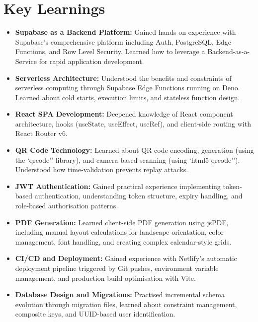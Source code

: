 \documentclass{SOICTthesis}
\begin{document}
\section{Key Learnings}
\label{sec:learnings}

\begin{itemize}
    \item \textbf{Supabase as a Backend Platform:} Gained hands-on experience with Supabase's comprehensive platform including Auth, PostgreSQL, Edge Functions, and Row Level Security. Learned how to leverage a Backend-as-a-Service for rapid application development.

    \item \textbf{Serverless Architecture:} Understood the benefits and constraints of serverless computing through Supabase Edge Functions running on Deno. Learned about cold starts, execution limits, and stateless function design.

    \item \textbf{React SPA Development:} Deepened knowledge of React component architecture, hooks (useState, useEffect, useRef), and client-side routing with React Router v6.

    \item \textbf{QR Code Technology:} Learned about QR code encoding, generation (using the `qrcode'' library), and camera-based scanning (using `html5-qrcode''). Understood how time-validation prevents replay attacks.

    \item \textbf{JWT Authentication:} Gained practical experience implementing token-based authentication, understanding token structure, expiry handling, and role-based authorisation patterns.

    \item \textbf{PDF Generation:} Learned client-side PDF generation using jsPDF, including manual layout calculations for landscape orientation, color management, font handling, and creating complex calendar-style grids.

    \item \textbf{CI/CD and Deployment:} Gained experience with Netlify's automatic deployment pipeline triggered by Git pushes, environment variable management, and production build optimisation with Vite.

    \item \textbf{Database Design and Migrations:} Practised incremental schema evolution through migration files, learned about constraint management, composite keys, and UUID-based user identification.
\end{itemize}
\end{document}
